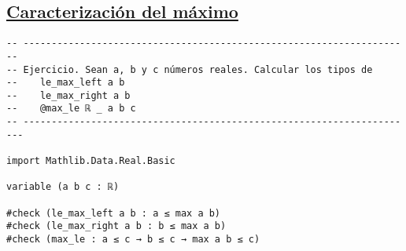 \subsection{\href{./src/Basicos/Caracterizacion\_del\_maximo.lean}{Caracterización del máximo}}
\label{sec:org221b75e}
\begin{verbatim}
-- ---------------------------------------------------------------------
-- Ejercicio. Sean a, b y c números reales. Calcular los tipos de
--    le_max_left a b
--    le_max_right a b
--    @max_le ℝ _ a b c
-- ----------------------------------------------------------------------

import Mathlib.Data.Real.Basic

variable (a b c : ℝ)

#check (le_max_left a b : a ≤ max a b)
#check (le_max_right a b : b ≤ max a b)
#check (max_le : a ≤ c → b ≤ c → max a b ≤ c)
\end{verbatim}

